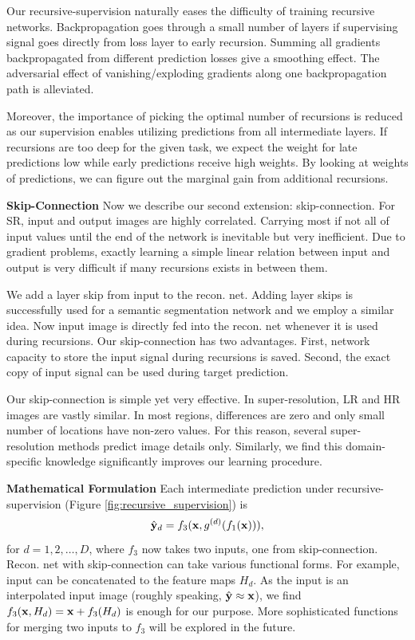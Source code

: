 \documentclass[10pt,twocolumn,letterpaper]{article}
\begin{document}
Our recursive-supervision naturally eases the difficulty of training recursive networks. Backpropagation goes through a small number of layers if supervising signal goes directly from loss layer to early recursion. Summing all gradients backpropagated from different prediction losses give a smoothing effect. The adversarial effect of vanishing/exploding gradients along one backpropagation path is alleviated.

Moreover, the importance of picking the optimal number of recursions is reduced as our supervision enables utilizing predictions from all intermediate layers. If recursions are too deep for the given task, we expect the weight for late predictions low while early predictions receive high weights. By looking at weights of predictions, we can figure out the marginal gain from additional recursions. 

\textbf{Skip-Connection} Now we describe our second extension: skip-connection. For SR, input and output images are highly correlated. Carrying most if not all of input values until the end of the network is inevitable but very inefficient. Due to gradient problems, exactly learning a simple linear relation between input and output is very difficult if many recursions exists in between them.  

We add a layer skip \cite{bishop2006pattern} from input to the recon. net. Adding layer skips is successfully used for a semantic segmentation network \cite{long2014fully} and we employ a similar idea. Now input image is directly fed into the recon. net whenever it is used during recursions. Our skip-connection has two advantages. First, network capacity to store the input signal during recursions is saved. Second, the exact copy of input signal can be used during target prediction. 

Our skip-connection is simple yet very effective. In super-resolution, LR and HR images are vastly similar. In most regions, differences are zero and only small number of locations have non-zero values. For this reason, several super-resolution methods \cite{Timofte2013, Timofte, bevilacqua2012,bevilacqua2013super} predict image details only. Similarly, we find this domain-specific knowledge significantly improves our learning procedure. 

\textbf{Mathematical Formulation} Each intermediate prediction under recursive-supervision (Figure \ref{fig:recursive_supervision}) is 
\begin{equation}
\hat{{\bf y}}_{d} = f_3({\bf x}, g^{(d)}(f_1({\bf x}))),
\end{equation}
for $d=1,2,\dots,D$, where $f_3$ now takes two inputs, one from skip-connection. Recon. net with skip-connection can take various functional forms. For example, input can be concatenated to the feature maps $H_d$. As the input is an interpolated input image (roughly speaking, $\hat{\bf y} \approx {\bf x}$), we find $f_3({\bf x}, H_d) = {\bf x} + f_3(H_d)$ is enough for our purpose. More sophisticated functions for merging two inputs to $f_3$ will be explored in the future. 
\end{document}
